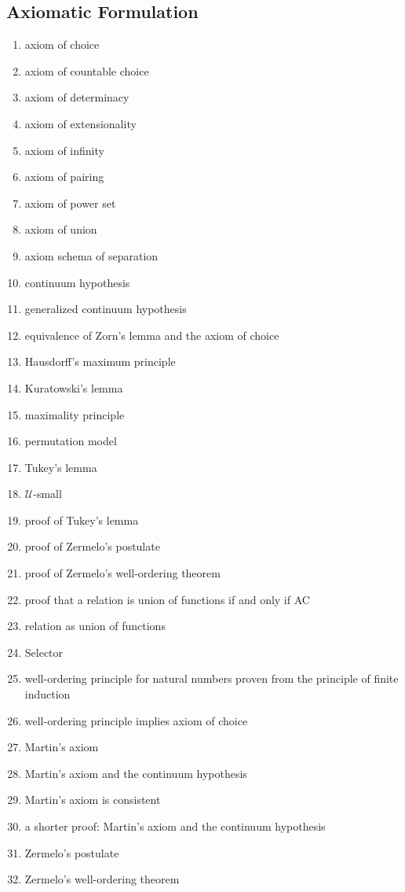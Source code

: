 \documentclass[12pt]{article}
\begin{document}
\begin{multicols}{2}
\section{Axiomatic Formulation}
\begin{enumerate}
\item axiom of choice
\item axiom of countable choice
\item axiom of determinacy
\item axiom of extensionality
\item axiom of infinity
\item axiom of pairing
\item axiom of power set
\item axiom of union 
\item axiom schema of separation
\item continuum hypothesis
\item generalized continuum hypothesis
\item equivalence of Zorn's lemma and the axiom of choice
\item Hausdorff's maximum principle
\item Kuratowski's lemma
\item maximality principle
\item permutation model
\item Tukey's lemma
\item $\mathcal{U}$-small
\item proof of Tukey's lemma
\item proof of Zermelo's postulate
\item proof of Zermelo's well-ordering theorem
\item proof that a relation is union of functions if and only if AC
\item relation as union of functions
\item Selector
\item well-ordering principle for natural numbers proven from the principle of finite induction 
\item well-ordering principle implies axiom of choice
\item Martin's axiom
\item Martin's axiom and the continuum hypothesis
\item Martin's axiom is consistent
\item a shorter proof: Martin's axiom and the continuum hypothesis
\item Zermelo's postulate 
\item Zermelo's well-ordering theorem

\end{enumerate}
\end{multicols}
\end{document}
